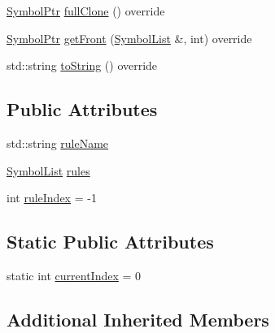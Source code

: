 \begin{DoxyCompactItemize}
\item 
\mbox{\hyperlink{namespace_erable_1_1_compiler_1_1_symbols_a8f0bc762f448ea4d84e8713ab3e140b9}{Symbol\+Ptr}} \mbox{\hyperlink{class_erable_1_1_compiler_1_1_symbols_1_1_rule_symbol_a23ad141caa8003ab2597cbc8fae841b9}{full\+Clone}} () override
\item 
\mbox{\hyperlink{namespace_erable_1_1_compiler_1_1_symbols_a8f0bc762f448ea4d84e8713ab3e140b9}{Symbol\+Ptr}} \mbox{\hyperlink{class_erable_1_1_compiler_1_1_symbols_1_1_rule_symbol_a484f836b4e62840e86bf99143f11c3e0}{get\+Front}} (\mbox{\hyperlink{namespace_erable_1_1_compiler_1_1_symbols_a63e8157d2f729d4689d27bacad42f8ed}{Symbol\+List}} \&, int) override
\item 
std\+::string \mbox{\hyperlink{class_erable_1_1_compiler_1_1_symbols_1_1_rule_symbol_a4fc1d4bfd6e2587308dc274fa0934511}{to\+String}} () override
\end{DoxyCompactItemize}
\subsection*{Public Attributes}
\begin{DoxyCompactItemize}
\item 
std\+::string \mbox{\hyperlink{class_erable_1_1_compiler_1_1_symbols_1_1_rule_symbol_a776f254959afc7fe4f4865f15673d5b8}{rule\+Name}}
\item 
\mbox{\hyperlink{namespace_erable_1_1_compiler_1_1_symbols_a63e8157d2f729d4689d27bacad42f8ed}{Symbol\+List}} \mbox{\hyperlink{class_erable_1_1_compiler_1_1_symbols_1_1_rule_symbol_ad6a20c302b8e59137d66859a96476545}{rules}}
\item 
int \mbox{\hyperlink{class_erable_1_1_compiler_1_1_symbols_1_1_rule_symbol_a9b90b0dc291088aa9d5f7d73f8cfc823}{rule\+Index}} = -\/1
\end{DoxyCompactItemize}
\subsection*{Static Public Attributes}
\begin{DoxyCompactItemize}
\item 
static int \mbox{\hyperlink{class_erable_1_1_compiler_1_1_symbols_1_1_rule_symbol_a05709dae98d3a85bbb6d271ac9035f37}{current\+Index}} = 0
\end{DoxyCompactItemize}
\subsection*{Additional Inherited Members}


